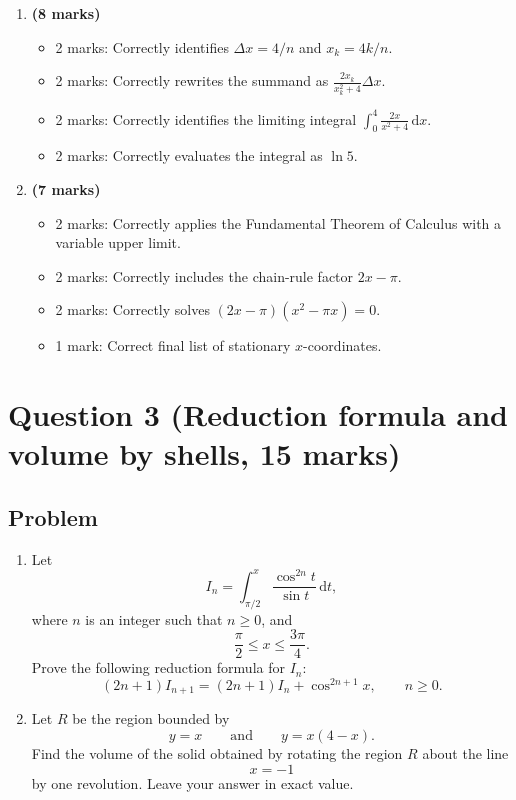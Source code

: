 \documentclass[12pt]{article}
\newcommand{\dd}{\,\mathrm{d}}
\begin{document}
\begin{enumerate}[label=(\alph*)]
\item \textbf{(8 marks)}
\begin{itemize}
\item 2 marks: Correctly identifies $\Delta x=4/n$ and $x_k=4k/n$.
\item 2 marks: Correctly rewrites the summand as $\frac{2x_k}{x_k^2+4}\Delta x$.
\item 2 marks: Correctly identifies the limiting integral $\int_0^4\frac{2x}{x^2+4}\dd x$.
\item 2 marks: Correctly evaluates the integral as $\ln 5$.
\end{itemize}

\item \textbf{(7 marks)}
\begin{itemize}
\item 2 marks: Correctly applies the Fundamental Theorem of Calculus with a variable upper limit.
\item 2 marks: Correctly includes the chain-rule factor $2x-\pi$.
\item 2 marks: Correctly solves $(2x-\pi)(x^2-\pi x)=0$.
\item 1 mark: Correct final list of stationary $x$-coordinates.
\end{itemize}
\end{enumerate}

\newpage
\section{Question 3 (Reduction formula and volume by shells, 15 marks)}

\subsection{Problem}

\begin{enumerate}[label=(\alph*)]
\item Let
\[
I_n=\int_{\pi/2}^x \frac{\cos^{2n}t}{\sin t}\dd t,
\]
where $n$ is an integer such that $n\ge 0$, and
\[
\frac{\pi}{2}\le x\le \frac{3\pi}{4}.
\]
Prove the following reduction formula for $I_n$:
\[
(2n+1)I_{n+1}=(2n+1)I_n+\cos^{2n+1}x,
\qquad n\ge0.
\]

\item Let $R$ be the region bounded by
\[
y=x
\qquad\text{and}\qquad
y=x(4-x).
\]
Find the volume of the solid obtained by rotating the region $R$ about the line
\[
x=-1
\]
by one revolution. Leave your answer in exact value.
\end{enumerate}
\end{document}
